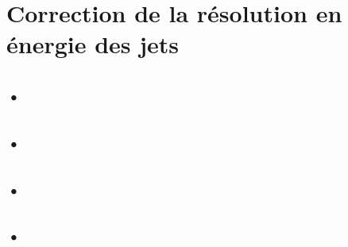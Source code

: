 \section{Correction de la résolution en énergie des jets}\label{chapter-JERC-section-JER}

\subsection{•}\label{chapter-JERC-section-JER-subsec-a}
\subsection{•}\label{chapter-JERC-section-JER-subsec-b}
\subsection{•}\label{chapter-JERC-section-JER-subsec-c}
\subsection{•}\label{chapter-JERC-section-JER-subsec-d}
